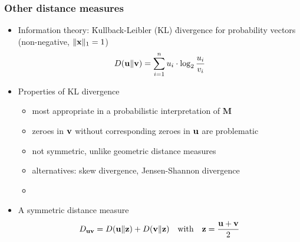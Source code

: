 \begin{frame}
  \frametitle{Other distance measures}
  
  \begin{itemize}
  \item Information theory: \h{Kullback-Leibler} (KL) \h{divergence} for probability vectors (non-negative, $\norm[1]{\vx} = 1$)
    \[
    \KL{\vu}{\vv} = \sum_{i=1}^n u_i \cdot \log_2 \frac{u_i}{v_i}
    \]
    \pause
  \item Properties of KL divergence
    \begin{itemize}
    \item most appropriate in a probabilistic interpretation of $\mathbf{M}$
    \item zeroes in $\vv$ without corresponding zeroes in $\vu$ are problematic
    \item not symmetric, unlike geometric distance measures
    \item alternatives: skew divergence, Jensen-Shannon divergence
    \item[]
    \end{itemize}
    \pause
  \item A symmetric distance measure \citep{Endres:Schindelin:03}
    \[
    D_{\vu\vv} = \KL{\vu}{\vz} + \KL{\vv}{\vz} \quad \text{with} \quad \vz = \frac{\vu + \vv}{2}
    \]
  \end{itemize}
\end{frame}

